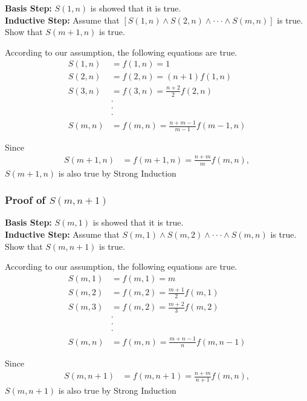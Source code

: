 \documentclass[11pt]{article}
\begin{document}
\textbf{Basis Step:} $S(1, n)$ is showed that it is true.\\
\textbf{Inductive Step:} Assume that $[S(1, n) \land S(2, n) \land \cdot \cdot \cdot \land S(m, n)]$ is true. Show that $S(m+1, n)$ is true.

According to our assumption, the following equations are true.
\begin{align*}
    S(1, n) &= f(1, n) = 1\\
    S(2, n) &= f(2, n) = (n+1) f(1, n)\\
    S(3, n) &= f(3, n) = \frac{n+2}{2} f(2, n)\\
    &\cdot\\
    &\cdot\\
    &\cdot\\
    S(m, n) &= f(m, n) = \frac{n+m-1}{m-1} f(m-1, n)
\end{align*}

Since
\begin{align}
    S(m+1, n) &= f(m+1, n) = \frac{n+m}{m} f(m, n),
\end{align}$S(m+1, n)$ is also true by Strong Induction


\subsubsection*{Proof of $S(m, n+1)$}

\textbf{Basis Step:} $S(m, 1)$ is showed that it is true.\\
\textbf{Inductive Step:} Assume that $S(m, 1) \land S(m, 2) \land \cdot \cdot \cdot \land S(m, n)$ is true. Show that $S(m, n+1)$ is true.

According to our assumption, the following equations are true.
\begin{align*}
    S(m, 1) &= f(m, 1) = m\\
    S(m, 2) &= f(m, 2) = \frac{m+1}{2} f(m, 1)\\
    S(m, 3) &= f(m, 2) = \frac{m+2}{3} f(m, 2)\\
    &\cdot\\
    &\cdot\\
    &\cdot\\
    S(m, n) &= f(m, n) = \frac{m+n-1}{n} f(m, n-1)
\end{align*}

Since
\begin{align}
    S(m, n+1) &= f(m, n+1) = \frac{n+m}{n+1} f(m, n),
\end{align}$S(m, n+1)$ is also true by Strong Induction
\end{document}
